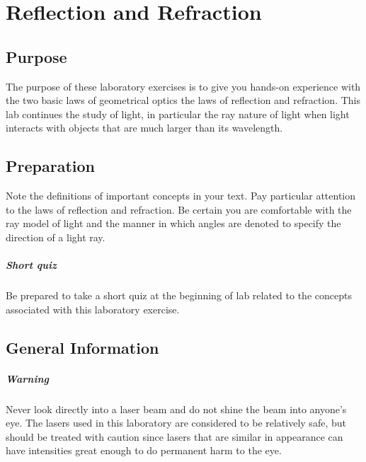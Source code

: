 \chapter{Reflection and Refraction}

\begin{multicols}{2}
\section{Purpose}
  The purpose of these laboratory exercises is to give you hands-on experience with the two basic laws of geometrical optics the laws of reflection and refraction. This lab continues the study of light, in particular the ray nature of light when light interacts with objects that are much larger than its wavelength.
  
\section{Preparation}
Note the definitions of important concepts in your text.  Pay particular attention to the laws of reflection and refraction.  Be certain you are comfortable with the ray model of light and the manner in which angles are denoted to specify the direction of a light ray.
\paragraph{Short quiz}
  Be prepared to take a short quiz at the beginning of lab related to the concepts associated with this laboratory exercise.
\section{General Information}

\paragraph{Warning}
  Never look directly into a laser beam and do not shine the beam into anyone's eye.  The lasers used in this laboratory are considered to be relatively safe, but should be treated with caution since lasers that are similar in appearance can have intensities great enough to do permanent harm to the eye.  
  

\end{multicols}
